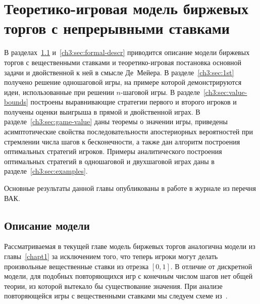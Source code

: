 \chapter{Теоретико-игровая модель биржевых торгов с непрерывными ставками} \label{chapt3}%
{
\newcommand{\Port}[1]{\ensuremath{\pi_{#1}}}
\newcommand*\dualFPS{\ensuremath{(p,\ \sigma)}}
\dualg[4][1=n, 2={\dualFPS}, 3=z, 4=\tau]{\ensuremath{g^*_{#1}({#3}, {#2}, {#4})}}


В разделах~\ref{ch3:sec:model-descr} и~\ref{ch3:sec:formal-descr} приводится описание модели биржевых торгов с вещественными ставками и теоретико-игровая постановка основной задачи и двойственной к ней в смысле Де~Мейера.
В разделе~\ref{ch3:sec:1st} получено решение одношаговой игры, на примере которой демонстрируются идеи, использованные при решении $n$-шаговой игры.
В разделе~\ref{ch3:sec:value-bounds} построены выравнивающие стратегии первого и второго игроков и получены оценки выигрыша в прямой и двойственной играх.
В разделе~\ref{ch3:sec:game-value} даны теоремы о значении игры, приведены асимптотические свойства последовательности апостериорных вероятностей при стремлении числа шагов к бесконечности, а также дан алгоритм построения оптимальных стратегий игроков.
Примеры аналитического построения оптимальных стратегий в одношаговой и двухшаговой играх даны в разделе~\ref{ch3:sec:examples}.

Основные результаты данной главы опубликованы в работе \cite{pyanykh16:cont} в журнале из перечня ВАК.

\section{Описание модели}
\label{ch3:sec:model-descr}

Рассматриваемая в текущей главе модель биржевых торгов аналогична модели из главы~\ref{chapt1} за исключением того, что теперь игроки могут делать произвольные вещественные ставки из отрезка $[0, 1]$.
В отличие от дискретной модели, для подобных повторяющихся игр с конечным числом шагов нет общей теории, из которой вытекало бы существование значения.
При анализе повторяющейся игры с вещественными ставками мы следуем схеме из~\cite{demeyer02c}.

}

